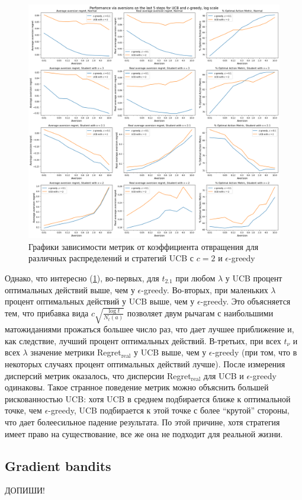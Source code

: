 \documentclass{article}
\begin{document}
\begin{figure}[ht!] %
\centering
\includegraphics[width=6in]{theory_tester/theory_images/UCB/compare_ucb_for_different_aversions.png}
\caption{Графики зависимости метрик от коэффициента отвращения для различных распределений и стратегий UCB с $c=2$ и $\epsilon$-greedy}
\label{fig:ucb_compare_ucb_for_different_aversions}
\end{figure}

Однако, что интересно (\ref{fig:ucb_compare_ucb_for_different_aversions}), во-первых, для $t_{2.1}$ при любом $\lambda$ у UCB процент оптимальных действий выше, чем у $\epsilon$-greedy. Во-вторых, при маленьких $\lambda$ процент оптимальных действий у UCB выше, чем у $\epsilon$-greedy. Это объясняется тем, что прибавка вида $c\sqrt{\frac{\log t}{N_t(a)}}$ позволяет двум рычагам с наибольшими матожиданиями прожаться большее число раз, что дает лучшее приближение и, как следствие, лучший процент оптимальных действий. В-третьих, при всех $t_{\nu}$ и всех $\lambda$ значение метрики Regret$_\text{real}$ у UCB выше, чем у $\epsilon$-greedy (при том, что в некоторых случаях процент оптимальных действий лучше). После измерения дисперсий метрик оказалось, что дисперсии Regret$_\text{real}$ для UCB и $\epsilon$-greedy одинаковы. Такое странное поведение метрик можно объяснить большей рискованностью UCB: хотя UCB в среднем подбирается ближе к оптимальной точке, чем $\epsilon$-greedy, UCB подбирается к этой точке с более ``крутой'' стороны, что дает болеесильное падение результата. По этой причине, хотя стратегия имеет право на существование, все же она не подходит для реальной жизни.

\subsection{Gradient bandits}

ДОПИШИ!



\end{document}
